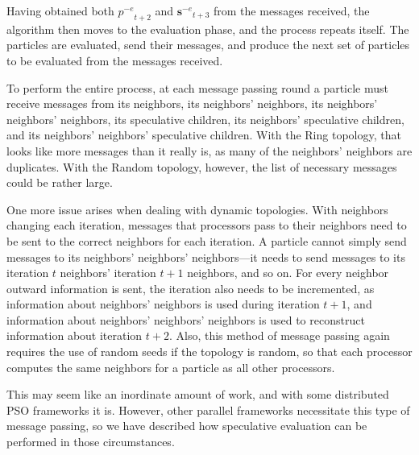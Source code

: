 \documentclass[journal,letterpaper]{IEEEtran}
\providecommand{\noeval}[1]{\ensuremath{#1^{-e}}}
\providecommand{\p}{\ensuremath{p}}
\providecommand{\sset}{\ensuremath{\mathbf{s}}}
\begin{document}
Having obtained both $\noeval{\p}_{t+2}$ and $\noeval{\sset}_{t+3}$ from the
messages received, the algorithm then moves to the evaluation phase, and the
process repeats itself.  The particles are evaluated, send their messages, and
produce the next set of particles to be evaluated from the messages received.

To perform the entire process, at each message passing round a particle must
receive messages from its neighbors, its neighbors' neighbors, its neighbors'
neighbors' neighbors, its speculative children, its neighbors' speculative
children, and its neighbors' neighbors' speculative children.  With the Ring
topology, that looks like more messages than it really is, as many of the
neighbors' neighbors are duplicates.  With the Random topology, however, the
list of necessary messages could be rather large.  

One more issue arises when dealing with dynamic topologies.  With neighbors
changing each iteration, messages that processors pass to their neighbors need
to be sent to the correct neighbors for each iteration.  A particle cannot
simply send messages to its neighbors' neighbors' neighbors---it needs to send
messages to its iteration $t$ neighbors' iteration $t+1$ neighbors, and so on.
For every neighbor outward information is sent, the iteration also needs to be
incremented, as information about neighbors' neighbors is used during iteration
$t+1$, and information about neighbors' neighbors' neighbors is used to
reconstruct information about iteration $t+2$.  Also, this method of message
passing again requires the use of random seeds if the topology is random, so
that each processor computes the same neighbors for a particle as all other
processors.

This may seem like an inordinate amount of work, and with some distributed PSO
frameworks it is.  However, other parallel frameworks necessitate this type of
message passing, so we have described how speculative evaluation can be
performed in those circumstances.




\end{document}
